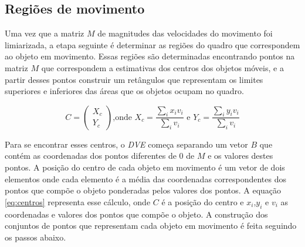 \subsection{Regiões de movimento}\label{sec:sub:regioesmovimento}

Uma vez que a matriz $M$ de magnitudes das velocidades do movimento foi limiarizada, a etapa seguinte é determinar as regiões do quadro que correspondem ao objeto em movimento. Essas regiões são determinadas encontrando pontos na matriz $M$ que correspondem a estimativas dos centros dos objetos móveis, e a partir desses pontos construir um retângulos que representam os limites superiores e inferiores das áreas que os objetos ocupam no quadro.

\begin{equation}
C=\begin{pmatrix}
X_c\\Y_c
\end{pmatrix}
\text{,onde } 
X_c = \frac{\sum_i x_iv_i}{\sum_iv_i}
\text{ e }
Y_c = \frac{\sum_i y_iv_i}{\sum_iv_i}
\label{eq:centros}
\end{equation}

Para se encontrar esses centros, o \textit{DVE} começa separando um vetor $B$ que contém as coordenadas dos pontos diferentes de $0$ de $M$ e os valores destes pontos. A posição do centro de cada objeto em movimento é um vetor de dois elementos onde cada elemento é a média das coordenadas correspondentes dos pontos que compõe o objeto ponderadas pelos valores dos pontos. A equação \ref{eq:centros} representa esse cálculo, onde $C$ é a posição do centro e $x_i$,$y_i$ e $v_i$ as coordenadas e valores dos pontos que compõe o objeto. A construção dos conjuntos de pontos que representam cada objeto em movimento é feita seguindo os passos abaixo.

